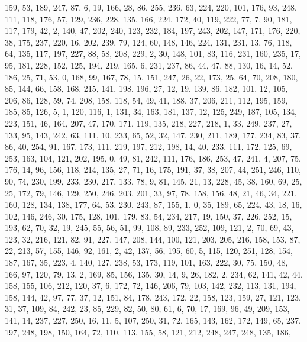 \begin{DoxyCode}
       159, 53, 189, 247, 87, 6, 19, 166, 28, 86, 255, 236, 63, 224, 220, 101, 176, 93, 248, 111, 118, 176, 57,
       129, 236, 228, 135, 166, 224, 172, 40, 119, 222, 77, 7, 90, 181, 117, 179, 42, 2, 140, 47, 202, 240, 123, 232,
       184, 197, 243, 202, 147, 171, 176, 220, 38, 175, 237, 220, 16, 202, 239, 79, 124, 60, 148, 146, 224, 131,
       231, 13, 76, 118, 64, 135, 117, 197, 227, 88, 58, 208, 229, 2, 30, 148, 101, 83, 116, 231, 160, 235, 17, 95,
       181, 228, 152, 125, 194, 219, 165, 6, 231, 237, 86, 44, 47, 88, 130, 16, 14, 52, 186, 25, 71, 53, 0, 168,
       99, 167, 78, 15, 151, 247, 26, 22, 173, 25, 64, 70, 208, 180, 85, 144, 66, 158, 168, 215, 141, 198, 196, 27,
       12, 19, 139, 86, 182, 101, 12, 105, 206, 86, 128, 59, 74, 208, 158, 118, 54, 49, 41, 188, 37, 206, 211, 112,
       195, 159, 185, 85, 126, 5, 1, 120, 116, 1, 131, 34, 163, 181, 137, 12, 125, 249, 187, 105, 134, 223, 151,
       46, 164, 207, 47, 170, 171, 119, 135, 218, 227, 218, 1, 33, 249, 237, 27, 133, 95, 143, 242, 63, 111, 10, 233,
       65, 52, 32, 147, 230, 211, 189, 177, 234, 83, 37, 86, 40, 254, 91, 167, 173, 111, 219, 197, 212, 198, 14,
       40, 233, 111, 172, 125, 69, 253, 163, 104, 121, 202, 195, 0, 49, 81, 242, 111, 176, 186, 253, 47, 241, 4,
       207, 75, 176, 14, 96, 156, 118, 214, 135, 27, 71, 16, 175, 191, 37, 38, 207, 44, 251, 246, 110, 90, 74, 230,
       199, 233, 230, 217, 133, 78, 9, 81, 145, 21, 13, 228, 45, 38, 160, 69, 25, 25, 172, 79, 146, 129, 250, 246,
       203, 201, 33, 97, 78, 158, 156, 48, 21, 46, 34, 221, 160, 128, 134, 138, 177, 64, 53, 230, 243, 87, 155, 1, 0,
       35, 189, 65, 224, 43, 18, 16, 102, 146, 246, 30, 175, 128, 101, 179, 83, 54, 234, 217, 19, 150, 37, 226,
       252, 15, 193, 62, 70, 32, 19, 245, 55, 56, 51, 99, 108, 89, 233, 252, 109, 121, 2, 70, 69, 43, 123, 32, 216,
       121, 82, 91, 227, 147, 208, 144, 100, 121, 203, 205, 216, 158, 153, 87, 22, 213, 57, 155, 146, 92, 161, 2,
       42, 137, 56, 195, 60, 5, 115, 120, 251, 128, 154, 187, 167, 35, 223, 4, 140, 127, 238, 53, 173, 119, 101, 163,
       222, 30, 75, 150, 48, 166, 97, 120, 79, 13, 2, 169, 85, 156, 135, 30, 14, 9, 26, 182, 2, 234, 62, 141, 42,
       44, 158, 155, 106, 212, 120, 37, 6, 172, 72, 146, 206, 79, 103, 142, 232, 113, 131, 194, 158, 144, 42, 97,
       77, 37, 12, 151, 84, 178, 243, 172, 22, 158, 123, 159, 27, 121, 123, 31, 37, 109, 84, 242, 23, 85, 229, 82,
       50, 80, 61, 6, 70, 17, 169, 96, 49, 209, 153, 141, 14, 237, 227, 250, 16, 11, 5, 107, 250, 31, 72, 165, 143,
       162, 172, 149, 65, 237, 197, 248, 198, 150, 164, 72, 110, 113, 155, 58, 121, 212, 248, 247, 248, 135, 186,

\end{DoxyCode}
